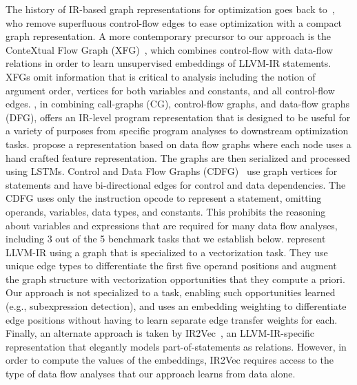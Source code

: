 The history of IR-based graph representations for optimization goes back
to~\citet{Ferrante1987}, who remove superfluous control-flow edges to ease
optimization with a compact graph representation. A more contemporary precursor
to our approach is the ConteXtual Flow Graph (XFG)~\citep{Ben-nun2018}, which
combines control-flow with data-flow relations in order to learn unsupervised
embeddings of LLVM-IR statements. XFGs omit information that is critical to
analysis including the notion of argument order, vertices for both variables and
constants, and all control-flow edges. \programl, in combining call-graphs (CG),
control-flow graphs, and data-flow graphs (DFG), offers an IR-level program
representation that is designed to be useful for a variety of purposes from
specific program analyses to downstream optimization tasks.
\citet{steiner2021value} propose a representation based on data flow graphs
where each node uses a hand crafted feature representation. The graphs are then
serialized and processed using LSTMs. Control and Data Flow Graphs
(CDFG)~\citep{Brauckmann2020} use graph vertices for statements and have
bi-directional edges for control and data dependencies. The CDFG uses only the
instruction opcode to represent a statement, omitting operands, variables, data
types, and constants. This prohibits the reasoning about variables and
expressions that are required for many data flow analyses, including 3 out of
the 5 benchmark tasks that we establish below. \citet{mendis2019compiler}
represent LLVM-IR using a graph that is specialized to a vectorization task.
They use unique edge types to differentiate the first five operand positions and
augment the graph structure with vectorization opportunities that they compute a
priori. Our approach is not specialized to a task, enabling such opportunities
learned (e.g., subexpression detection), and uses an embedding weighting to
differentiate edge positions without having to learn separate edge transfer
weights for each. Finally, an alternate approach is taken by
IR2Vec~\citep{KeerthyS2019}, an LLVM-IR-specific representation that elegantly
models part-of-statements as relations. However, in order to compute the values
of the embeddings, IR2Vec requires access to the type of data flow analyses that
our approach learns from data alone.
